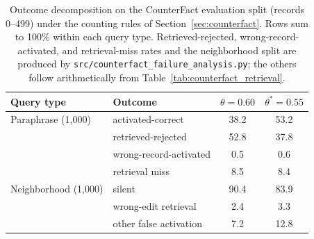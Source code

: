 \documentclass[preprint,12pt]{elsarticle}
\newif\ifmarkchanges
\newcommand{\rev}[1]{#1}
\newcommand{\revii}[1]{\ifmarkchanges{\color{blue}#1}\else#1\fi}
\begin{document}
\begin{table}[t]
\centering
\caption{\rev{Outcome decomposition on the CounterFact evaluation split (records 0--499) under the counting rules of Section~\ref{sec:counterfact}. Rows sum to 100\% within each query type. \revii{Retrieved-rejected, wrong-record-activated, and retrieval-miss rates and the neighborhood split are} produced by \texttt{src/counterfact\_failure\_analysis.py}; the others follow arithmetically from Table~\ref{tab:counterfact_retrieval}.}}
\label{tab:counterfact_buckets}
\vspace{0.5em}
\footnotesize
\begin{tabular}{@{}llcc@{}}
\toprule
Query type & Outcome & $\theta=0.60$ & $\theta^*=0.55$ \\
\midrule
Paraphrase (1,000) & activated-correct & 38.2 & 53.2 \\
 & retrieved-rejected & 52.8 & 37.8 \\
 & wrong-record-activated & 0.5 & 0.6 \\
 & retrieval miss & 8.5 & 8.4 \\
\midrule
Neighborhood (1,000) & silent & 90.4 & 83.9 \\
 & wrong-edit retrieval & 2.4 & 3.3 \\
 & other false activation & 7.2 & 12.8 \\
\bottomrule
\end{tabular}
\end{table}
\end{document}
